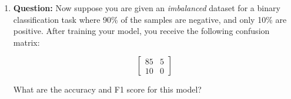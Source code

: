 \documentclass{article}
\begin{document}
\begin{enumerate}
    What are the accuracy and F1 score for this model?

    \begin{enumerate}
        \item Accuracy = 0.80, F1 Score = 0.80
        \item Accuracy = 0.90, F1 Score = 0.90
        \item Accuracy = 0.90, F1 Score = 0.89
        \item Accuracy = 0.95, F1 Score = 0.94
    \end{enumerate}

    \textbf{Solution:} \newline
    In this balanced dataset, the number of positive and negative samples is equal, so both accuracy and F1 score should give a good representation of model performance. To calculate accuracy, we use the formula:

    \[
    \text{Accuracy} = \frac{\text{TP} + \text{TN}}{\text{TP} + \text{TN} + \text{FP} + \text{FN}} = \frac{40 + 40}{40 + 40 + 10 + 10} = 0.80
    \]

    Next, for the F1 score, we calculate precision and recall:

    \[
    \text{Precision} = \frac{\text{TP}}{\text{TP} + \text{FP}} = \frac{40}{40 + 10} = 0.80
    \]
    
    \[
    \text{Recall} = \frac{\text{TP}}{\text{TP} + \text{FN}} = \frac{40}{40 + 10} = 0.80
    \]

    Then, the F1 score is:

    \[
    \text{F1 Score} = 2 \times \frac{\text{Precision} \times \text{Recall}}{\text{Precision} + \text{Recall}} = 2 \times \frac{0.80 \times 0.80}{0.80 + 0.80} = 0.80
    \]

    Thus, the correct answer is: \textbf{(a) Accuracy = 0.80, F1 Score = 0.80}.

    \item \textbf{Question:} \newline
    Now suppose you are given an \textit{imbalanced} dataset for a binary classification task where 90\% of the samples are negative, and only 10\% are positive. After training your model, you receive the following confusion matrix:

    \[
    \begin{bmatrix}
    85 & 5 \\
    10 & 0
    \end{bmatrix}
    \]

    What are the accuracy and F1 score for this model?


\end{enumerate}
\end{document}
